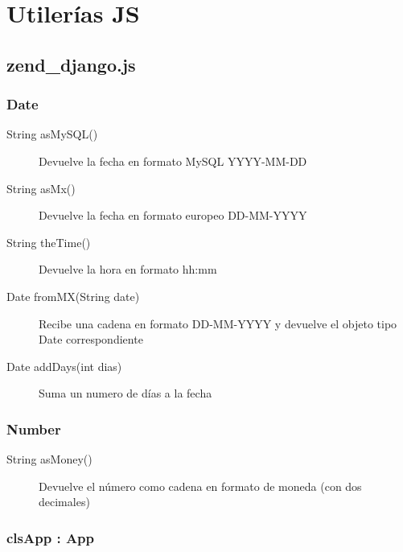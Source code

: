 \chapter{Utilerías JS}

\section{zend\_django.js}

\subsection{Date}

\begin{description}
	\item[String asMySQL()] Devuelve la fecha en formato MySQL YYYY-MM-DD
	\item[String asMx()] Devuelve la fecha en formato europeo DD-MM-YYYY
	\item[String theTime()] Devuelve la hora en formato hh:mm
	\item[Date fromMX(String date)] Recibe una cadena en formato DD-MM-YYYY y devuelve el objeto tipo Date correspondiente
	\item[Date addDays(int dias)] Suma un numero de días a la fecha
\end{description}

\subsection{Number}

\begin{description}
	\item[String asMoney()] Devuelve el número como cadena en formato de moneda (con dos decimales)
\end{description}

\subsection{clsApp : App}

